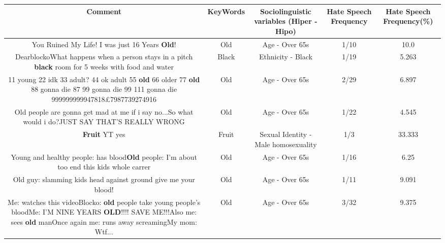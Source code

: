 \documentclass[11pt]{article}
\newlength\mylength
\begin{document}
\begin{center}
\setlength\mylength{\dimexpr\textwidth - 1\arrayrulewidth - 50\tabcolsep}
\begin{longtable}{|C{.65\mylength}|C{.30\mylength}|C{.12\mylength}|C{.12\mylength}|C{.12\mylength}|}
\hline
\textbf{Comment} & \textbf{KeyWords} & \textbf{Sociolinguistic variables (Hiper - Hipo)}  & \textbf{Hate Speech Frequency} & \textbf{Hate Speech Frequency(\%)} \\
\hline{}\small You Ruined My Life! I was just 16 Years \textbf{Old}!\normalsize   & Old & Age - Over 65s & 1/10 & 10.0 \\  \hline
  \small DearblockoWhat happens when a person stays in a pitch \textbf{black} room for 5 weeks with food and water\normalsize   & Black & Ethnicity - Black & 1/19 & 5.263 \\  \hline
  \small {} 11 young 22 idk 33 adult? 44 ok adult 55 \textbf{old} 66 older 77 \textbf{old} 88 gonna die 87 99 gonna die 99 111 gonna die 999999999947818£7987739274916\normalsize   & Old & Age - Over 65s & 2/29 & 6.897 \\  \hline
  \small Old people are gonna get mad at me if i say no...So what would i do?JUST SAY THAT'S REALLY WRONG\normalsize   & Old & Age - Over 65s & 1/22 & 4.545 \\  \hline
  \small \@\textbf{Fruit} YT yes\normalsize   & Fruit & Sexual Identity - Male homosexuality & 1/3 & 33.333 \\  \hline
  \small Young and healthy people: has blood\textbf{Old} people: I'm about too end this kids whole carrer\normalsize   & Old & Age - Over 65s & 1/16 & 6.25 \\  \hline
  \small Old guy: slamming kids head against ground give me your blood!\normalsize   & Old & Age - Over 65s & 1/11 & 9.091 \\  \hline
  \small Me: watches this videoBlocko: \textbf{old} people take young people's bloodMe: I'M NINE YEARS \textbf{OLD}!!!! SAVE ME!!!Also me: sees \textbf{old} manOnce again me: runs away screamingMy mom: Wtf...\normalsize   & Old & Age - Over 65s & 3/32 & 9.375 \\  \hline

\end{longtable}
\end{center}
\end{document}
